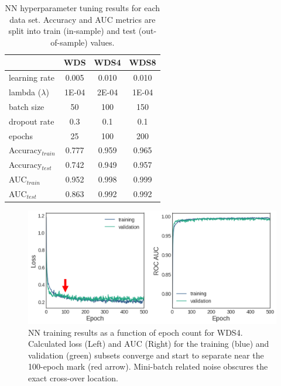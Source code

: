 \begin{table}[htp]
\centering
\begin{tabular}{l|c|c|c|}
\cline{2-4}
                                      & WDS   & WDS4  & WDS8  \\ \hline
\multicolumn{1}{|l|}{learning rate}   & 0.005 & 0.010 & 0.010 \\ \hline
\multicolumn{1}{|l|}{lambda ($\lambda$)}          & 1E-04 & 2E-04 & 1E-04 \\ \hline
\multicolumn{1}{|l|}{batch size}      & 50    & 100   & 150   \\ \hline
\multicolumn{1}{|l|}{dropout rate}    & 0.3   & 0.1   & 0.1   \\ \hline
\multicolumn{1}{|l|}{epochs}          & 25    & 100   & 200   \\ \hline
\multicolumn{1}{|l|}{Accuracy$_{train}$} & 0.777 & 0.959 & 0.965 \\ \hline
\multicolumn{1}{|l|}{Accuracy$_{test}$}  & 0.742 & 0.949 & 0.957 \\ \hline
\multicolumn{1}{|l|}{AUC$_{train}$}      & 0.952 & 0.998 & 0.999 \\ \hline
\multicolumn{1}{|l|}{AUC$_{test}$}       & 0.863 & 0.992 & 0.992 \\ \hline
\end{tabular}
\singlespacing
\caption[Neural network hyperparameter tuning results]{NN hyperparameter tuning results for each data set. Accuracy and AUC metrics are split into train (in-sample) and test (out-of-sample) values.}
\label{tab:nn_tuning}
\end{table}

\begin{figure}[htp]
\centering
\includegraphics[width=\textwidth]{templates/images/Figure-NN-Training-Loss.png}
\caption[Neural network training loss]{NN training results as a function of epoch count for WDS4. Calculated loss (Left) and AUC (Right) for the training (blue) and validation (green) subsets converge and start to separate near the 100-epoch mark (red arrow). Mini-batch related noise obscures the exact cross-over location.}
\label{fig:nn_loss_plot}
\end{figure}

